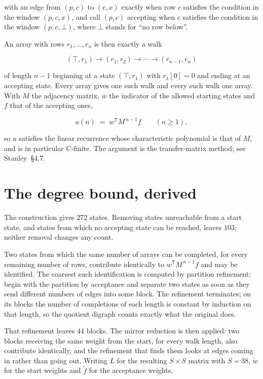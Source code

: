 \documentclass[11pt]{article}
\theoremstyle{definition}
\begin{document}
with an edge from $(p,c)$ to $(c,x)$ exactly when row $c$ satisfies the condition in the window $(p,c,x)$, and call $(p,c)$ accepting when $c$ satisfies the condition in the window $(p,c,\bot)$, where $\bot$ stands for ``no row below''.

An array with rows $r_1,\dots,r_n$ is then exactly a walk

\[(\top,r_1) \to (r_1,r_2) \to \cdots \to (r_{n-1},r_n)\]

of length $n-1$ beginning at a state $(\top,r_1)$ with $r_1[0]=0$ and ending at an accepting state. Every array gives one such walk and every such walk one array. With $M$ the adjacency matrix, $w$ the indicator of the allowed starting states and $f$ that of the accepting ones,

\[a(n) \;=\; w^{\mathsf T} M^{\,n-1} f \qquad (n \ge 1),\]

so $a$ satisfies the linear recurrence whose characteristic polynomial is that of $M$, and is in particular C-finite. The argument is the transfer-matrix method; see Stanley~\S4.7.

\section{The degree bound, derived}

The construction gives $272$ states. Removing states unreachable from a start state, and states from which no accepting state can be reached, leaves $103$; neither removal changes any count.

Two states from which the same number of arrays can be completed, for every remaining number of rows, contribute identically to $w^{\mathsf T}M^{\,n-1}f$ and may be identified. The coarsest such identification is computed by partition refinement: begin with the partition by acceptance and separate two states as soon as they send different numbers of edges into some block. The refinement terminates; on its blocks the number of completions of each length is constant by induction on that length, so the quotient digraph counts exactly what the original does.

That refinement leaves $44$ blocks. The mirror reduction is then applied: two blocks receiving the same weight from the start, for every walk length, also contribute identically, and the refinement that finds them looks at edges coming in rather than going out. Writing $L$ for the resulting $S \times S$ matrix with $S = 38$, $\tilde w$ for the start weights and $\tilde f$ for the acceptance weights,
\end{document}
